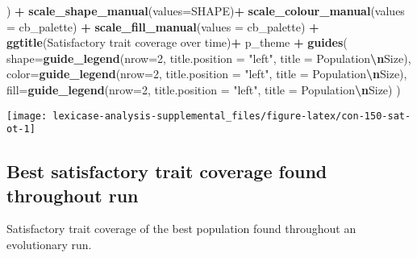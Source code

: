 \documentclass[
]{book}
\newenvironment{Shaded}{\begin{snugshade}}{\end{snugshade}}
\newcommand{\AttributeTok}[1]{\textcolor[rgb]{0.13,0.29,0.53}{#1}}
\newcommand{\DecValTok}[1]{\textcolor[rgb]{0.00,0.00,0.81}{#1}}
\newcommand{\FunctionTok}[1]{\textcolor[rgb]{0.13,0.29,0.53}{\textbf{#1}}}
\newcommand{\NormalTok}[1]{#1}
\newcommand{\SpecialCharTok}[1]{\textcolor[rgb]{0.81,0.36,0.00}{\textbf{#1}}}
\newcommand{\StringTok}[1]{\textcolor[rgb]{0.31,0.60,0.02}{#1}}
\begin{document}
\begin{Shaded}
\begin{Highlighting}[]
\NormalTok{  ) }\SpecialCharTok{+}
  \FunctionTok{scale\_shape\_manual}\NormalTok{(}\AttributeTok{values=}\NormalTok{SHAPE)}\SpecialCharTok{+}
  \FunctionTok{scale\_colour\_manual}\NormalTok{(}\AttributeTok{values =}\NormalTok{ cb\_palette) }\SpecialCharTok{+}
  \FunctionTok{scale\_fill\_manual}\NormalTok{(}\AttributeTok{values =}\NormalTok{ cb\_palette) }\SpecialCharTok{+}
  \FunctionTok{ggtitle}\NormalTok{(}\StringTok{\textquotesingle{}Satisfactory trait coverage over time\textquotesingle{}}\NormalTok{)}\SpecialCharTok{+}
\NormalTok{  p\_theme }\SpecialCharTok{+}
  \FunctionTok{guides}\NormalTok{(}
    \AttributeTok{shape=}\FunctionTok{guide\_legend}\NormalTok{(}\AttributeTok{nrow=}\DecValTok{2}\NormalTok{, }\AttributeTok{title.position =} \StringTok{"left"}\NormalTok{, }\AttributeTok{title =} \StringTok{\textquotesingle{}Population}\SpecialCharTok{\textbackslash{}n}\StringTok{Size\textquotesingle{}}\NormalTok{),}
    \AttributeTok{color=}\FunctionTok{guide\_legend}\NormalTok{(}\AttributeTok{nrow=}\DecValTok{2}\NormalTok{, }\AttributeTok{title.position =} \StringTok{"left"}\NormalTok{, }\AttributeTok{title =} \StringTok{\textquotesingle{}Population}\SpecialCharTok{\textbackslash{}n}\StringTok{Size\textquotesingle{}}\NormalTok{),}
    \AttributeTok{fill=}\FunctionTok{guide\_legend}\NormalTok{(}\AttributeTok{nrow=}\DecValTok{2}\NormalTok{, }\AttributeTok{title.position =} \StringTok{"left"}\NormalTok{, }\AttributeTok{title =} \StringTok{\textquotesingle{}Population}\SpecialCharTok{\textbackslash{}n}\StringTok{Size\textquotesingle{}}\NormalTok{)}
\NormalTok{  )}
\end{Highlighting}
\end{Shaded}

\texttt{[image: lexicase-analysis-supplemental\_files/figure-latex/con-150-sat-ot-1]}

\hypertarget{best-satisfactory-trait-coverage-found-throughout-run}{%
\subsection{Best satisfactory trait coverage found throughout run}\label{best-satisfactory-trait-coverage-found-throughout-run}}

Satisfactory trait coverage of the best population found throughout an evolutionary run.
\end{document}
